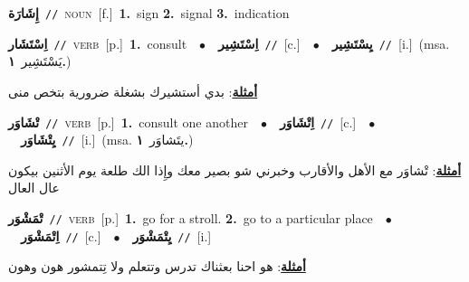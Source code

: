 \documentclass[10pt,a4paper,twoside]{article} %
\begin{document}
\begin{multicols}{2}
{\setlength\topsep{0pt}\textbf{\foreignlanguage{arabic}{إِشَارَة}}\ {\color{gray}\texttt{//}\color{black}}\ \textsc{noun}\ [f.]\ \textbf{1.}~sign  \textbf{2.}~signal  \textbf{3.}~indication\ } \vspace{2mm}

{\setlength\topsep{0pt}\textbf{\foreignlanguage{arabic}{اِسْتَشَار}}\ {\color{gray}\texttt{//}\color{black}}\ \textsc{verb}\ [p.]\ \textbf{1.}~consult\ \ $\bullet$\ \ \setlength\topsep{0pt}\textbf{\foreignlanguage{arabic}{اِسْتَشِير}}\ {\color{gray}\texttt{//}\color{black}}\ [c.]\ \ $\bullet$\ \ \setlength\topsep{0pt}\textbf{\foreignlanguage{arabic}{يِسْتَشِير}}\ {\color{gray}\texttt{//}\color{black}}\ [i.]\ \color{gray}(msa. \foreignlanguage{arabic}{يَسْتَشِير}~\foreignlanguage{arabic}{\textbf{١.}})\color{black}\  \begin{flushright}\color{gray}\foreignlanguage{arabic}{\textbf{\underline{\foreignlanguage{arabic}{أمثلة}}}: بدي أستشيرك بشغلة ضرورية بتخص منى}\end{flushright}\color{black}} \vspace{2mm}

{\setlength\topsep{0pt}\textbf{\foreignlanguage{arabic}{تْشَاوَر}}\ {\color{gray}\texttt{//}\color{black}}\ \textsc{verb}\ [p.]\ \textbf{1.}~consult one another\ \ $\bullet$\ \ \setlength\topsep{0pt}\textbf{\foreignlanguage{arabic}{اِتْشَاوَر}}\ {\color{gray}\texttt{//}\color{black}}\ [c.]\ \ $\bullet$\ \ \setlength\topsep{0pt}\textbf{\foreignlanguage{arabic}{يِتْشَاوَر}}\ {\color{gray}\texttt{//}\color{black}}\ [i.]\ \color{gray}(msa. \foreignlanguage{arabic}{يتَشاوَر}~\foreignlanguage{arabic}{\textbf{١.}})\color{black}\  \begin{flushright}\color{gray}\foreignlanguage{arabic}{\textbf{\underline{\foreignlanguage{arabic}{أمثلة}}}: تْشاوَر مع الأهل والأقارب وخبرني شو بصير معك وإِذا الك طلعة يوم الأثنين بيكون عال العال}\end{flushright}\color{black}} \vspace{2mm}

{\setlength\topsep{0pt}\textbf{\foreignlanguage{arabic}{تْمَشْوَر}}\ {\color{gray}\texttt{//}\color{black}}\ \textsc{verb}\ [p.]\ \textbf{1.}~go for a stroll.  \textbf{2.}~go to a particular place\ \ $\bullet$\ \ \setlength\topsep{0pt}\textbf{\foreignlanguage{arabic}{اِتْمَشْوَر}}\ {\color{gray}\texttt{//}\color{black}}\ [c.]\ \ $\bullet$\ \ \setlength\topsep{0pt}\textbf{\foreignlanguage{arabic}{يِتْمَشْوَر}}\ {\color{gray}\texttt{//}\color{black}}\ [i.]\  \begin{flushright}\color{gray}\foreignlanguage{arabic}{\textbf{\underline{\foreignlanguage{arabic}{أمثلة}}}: هو احنا بعثناك تدرس وتتعلم ولا تِتمشور هون وهون}\end{flushright}\color{black}} \vspace{2mm}


\end{multicols}
\end{document}

